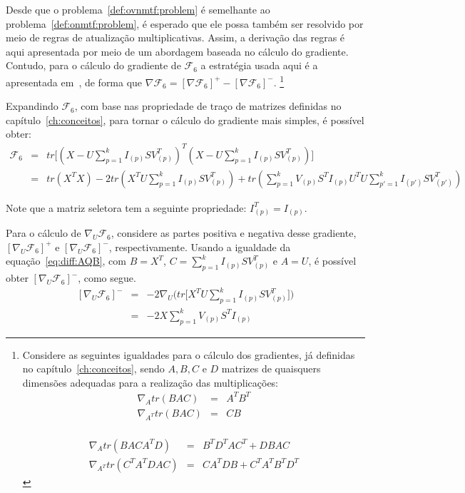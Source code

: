 \documentclass[
    12pt,                %
    oneside,            %
    a4paper,            %
    english,            %
    brazil                %
    ]{abntex2ppgsi}
\newcommand\blfootnote[1]{%
  \begingroup
  \renewcommand\thefootnote{}\footnote{#1}%
  \addtocounter{footnote}{-1}%
  \endgroup
}
\begin{document}
Desde que o problema~\ref{def:ovnmtf:problem} é semelhante ao problema~\ref{def:onmtf:problem}, é esperado que ele possa também ser resolvido por meio de regras de atualização multiplicativas.
Assim, a derivação das regras é aqui apresentada por meio de um abordagem baseada no cálculo do gradiente.
Contudo, para o cálculo do gradiente de $\mathcal{F}_6$ a estratégia usada aqui é a apresentada em~, de forma que $\nabla \mathcal{F}_6 = [\nabla \mathcal{F}_6]^+ - [\nabla \mathcal{F}_6]^-$.\blfootnote{Considere as seguintes igualdades para o cálculo dos gradientes, já definidas no capítulo~\ref{ch:conceitos}, sendo $A, B, C$ e $D$ matrizes de quaisquers dimensões adequadas para a realização das multiplicações:
\begin{equation}
\label{eq:diff:AQB}
\begin{array}{lcl}
\nabla_A tr( BAC )     & = & A^T B^T \\
\nabla_{A^T} tr( BAC ) & = & C B \\
\end{array}
\end{equation}

\begin{equation}
\label{eq:diff:AQBQtC}
\begin{array}{lcl}
\nabla_A tr( BACA^TD )     & = & B^TD^TAC^T + DBAC \\
\nabla_{A^T} tr( C^TA^TDAC ) & = & CA^TDB + C^TA^TB^TD^T
\end{array}
\end{equation}
}

Expandindo $\mathcal{F}_6$, com base nas propriedade de traço de matrizes definidas no capítulo~\ref{ch:conceitos}, para tornar o cálculo do gradiente mais simples, é possível obter:
\[
    \begin{array}{lcl}
        \displaystyle \mathcal{F}_6 & = & tr\big[ (X - U\sum_{p=1}^{k}I_{(p)}SV_{(p)}^T)^T (X - U\sum_{p=1}^{k}I_{(p)}SV_{(p)}^T) \big] \\
                                    & = & tr(X^TX) - 2 tr( X^T U \sum_{p=1}^{k} I_{(p)} S V_{(p)}^T ) + tr( \sum_{p=1}^{k} V_{(p)} S^T I_{(p)} U^T U \sum_{p'=1}^k I_{(p')} S V_{(p')}^T )
    \end{array}
\]

Note que a matriz seletora tem a seguinte propriedade: $I_{(p)}^T = I_{(p)}$.

Para o cálculo de $\nabla_U \mathcal{F}_6$, considere as partes positiva e negativa desse gradiente, $[\nabla_U \mathcal{F}_6]^+$ e $[\nabla_U \mathcal{F}_6]^-$, respectivamente.
Usando a igualdade da equação~\ref{eq:diff:AQB}, com $B = X^T$, $C = \sum_{p=1}^{k}I_{(p)}SV_{(p)}^T$ e $A = U$, é possível obter $[\nabla_U \mathcal{F}_6]^-$, como segue.
\[
    \begin{array}{lcl}
        [\nabla_U \mathcal{F}_6]^- & = & - 2 \nabla_U \Big( tr\big[ X^T U \sum_{p=1}^{k}I_{(p)}SV_{(p)}^T \big] \Big) \\
                                   & = & - 2 X \sum_{p=1}^{k} V_{(p)} S^T I_{(p)}
    \end{array}
\]
\end{document}

